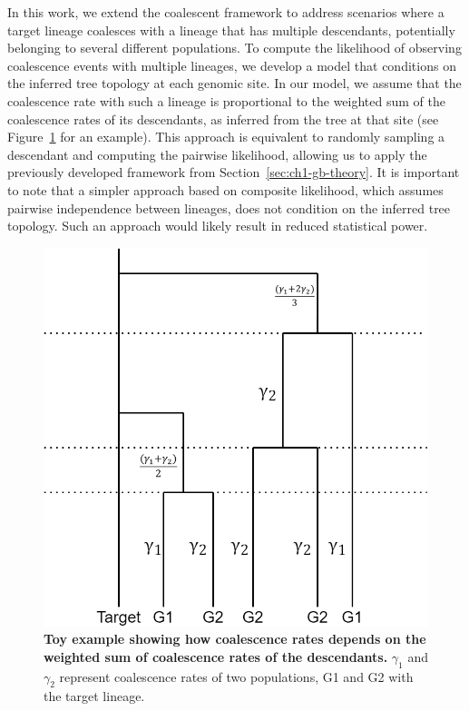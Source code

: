 In this work, we extend the coalescent framework to address scenarios where a target lineage coalesces with a lineage that has multiple descendants, potentially belonging to several different populations. To compute the likelihood of observing coalescence events with multiple lineages, we develop a model that conditions on the inferred tree topology at each genomic site. In our model, we assume that the coalescence rate with such a lineage is proportional to the weighted sum of the coalescence rates of its descendants, as inferred from the tree at that site (see Figure~\ref{fig1} for an example). This approach is equivalent to randomly sampling a descendant and computing the pairwise likelihood, allowing us to apply the previously developed framework from Section~\ref{sec:ch1-gb-theory}. It is important to note that a simpler approach based on composite likelihood, which assumes pairwise independence between lineages, does not condition on the inferred tree topology. Such an approach would likely result in reduced statistical power.

\begin{figure}[h!]
    \centering
    \includegraphics[scale=0.275]{figures/ghost buster simon myers-Page-1.png}
    \caption{\textbf{Toy example showing how coalescence rates depends on the weighted sum of coalescence rates of the descendants.} $\gamma_1$ and $\gamma_2$ represent coalescence rates of two populations, G1 and G2 with the target lineage.}
    \label{fig1}
\end{figure}

